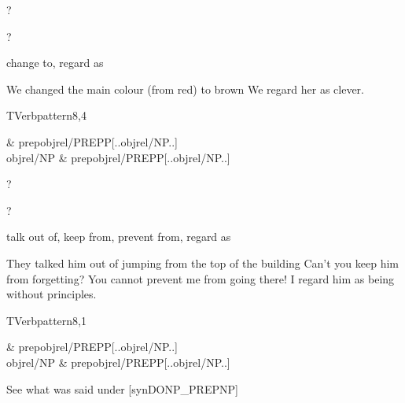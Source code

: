 
\begin{thetadescr}
\evitem ?
\esitem
     \begin{examples}
        \example ?
     \end{examples}
\end{thetadescr}



\begin{thetadescr}
\evitem change to, regard as
\esitem
     \begin{examples}
        \example  We changed the main colour (from red) to brown
        \example  We regard her as clever.
     \end{examples}
\end{thetadescr}


\newpage
{}
\begin{vpattern}
 TVerbpattern8,4
\csritem \mbox{}\\
     \begin{csr}
                & prepobjrel/PREPP[..objrel/NP..]\\
      objrel/NP & prepobjrel/PREPP[..objrel/NP..]
     \end{csr}
\remarksitem
\end{vpattern}


\begin{thetadescr}
\evitem ?
\esitem
     \begin{examples}
        \example ?
     \end{examples}
\end{thetadescr}



\begin{thetadescr}
\evitem talk out of, keep from, prevent 
from, regard as
\esitem
     \begin{examples}
        \example  They talked him out of jumping from the top of the building
        \example  Can't you keep him from forgetting?
        \example  You cannot prevent me from going there!
        \example  I regard him as being without principles.
     \end{examples}
\end{thetadescr}


\newpage
{}
\begin{vpattern}
 TVerbpattern8,1
\csritem \mbox{}\\
     \begin{csr}
                & prepobjrel/PREPP[..objrel/NP..]\\
      objrel/NP & prepobjrel/PREPP[..objrel/NP..]
     \end{csr}
\remarksitem See what was said under [synDONP\_PREPNP]
\end{vpattern}

